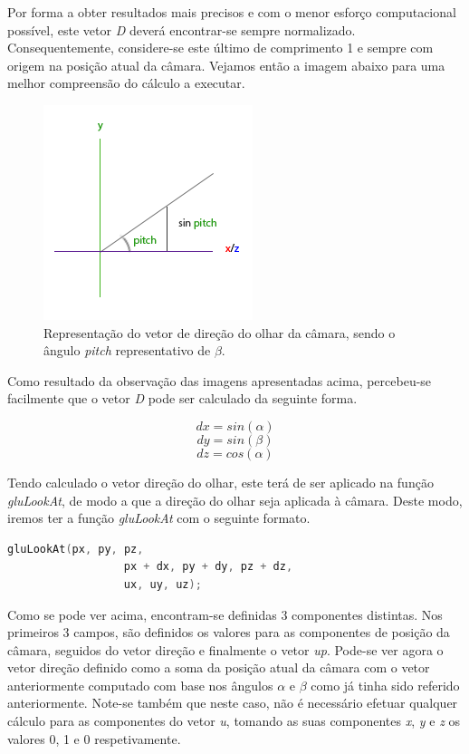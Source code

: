 \documentclass[a4paper]{article}
\begin{document}
Por forma a obter resultados mais precisos e com o menor esforço computacional possível, este vetor \textit{D} deverá encontrar-se sempre normalizado. Consequentemente, considere-se este último de comprimento 1 e sempre com origem na posição atual da câmara. Vejamos então a imagem abaixo para uma melhor compreensão do cálculo a executar.

\begin{figure}[!h]
    \centering
    \includegraphics[width=0.5\linewidth]{camera_pitch.png}
    \caption{Representação do vetor de direção do olhar da câmara, sendo o ângulo \textit{pitch} representativo de $\beta$.}
    \label{fig:ref_FPS1}
\end{figure}

Como resultado da observação das imagens apresentadas acima, percebeu-se facilmente que o vetor \textit{D} pode ser calculado da seguinte forma.

\[ dx = sin(\alpha) \]
\[ dy = sin(\beta) \]
\[ dz = cos(\alpha) \]

Tendo calculado o vetor direção do olhar, este terá de ser aplicado na função \textit{gluLookAt}, de modo a que a direção do olhar seja aplicada à câmara. Deste modo, iremos ter a função \textit{gluLookAt} com o seguinte formato.

\begin{lstlisting}[language=C++, caption=Definição da função \textit{gluLookAt}.]
        gluLookAt(px, py, pz,
                  px + dx, py + dy, pz + dz,
                  ux, uy, uz);
\end{lstlisting}

Como se pode ver acima, encontram-se definidas 3 componentes distintas. Nos primeiros 3 campos, são definidos os valores para as componentes de posição da câmara, seguidos do vetor direção e finalmente o vetor \textit{up}. Pode-se ver agora o vetor direção definido como a soma da posição atual da câmara com o vetor anteriormente computado com base nos ângulos $\alpha$ e $\beta$ como já tinha sido referido anteriormente. Note-se também que neste caso, não é necessário efetuar qualquer cálculo para as componentes do vetor \textit{u}, tomando as suas componentes \textit{x}, \textit{y} e \textit{z} os valores 0, 1 e 0 respetivamente.
\end{document}
